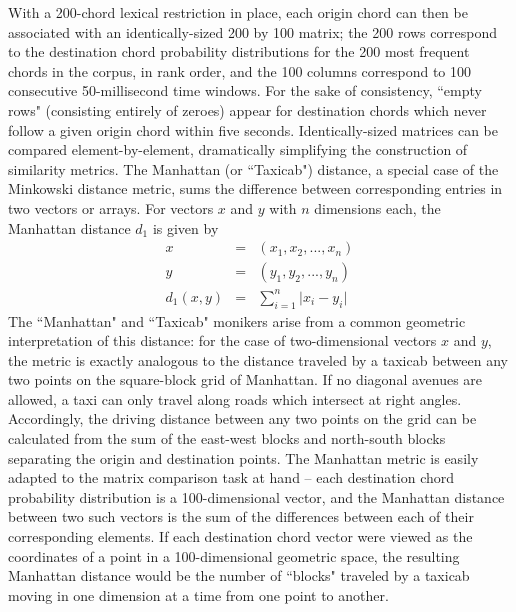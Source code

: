 With a 200-chord lexical restriction in place, each origin chord can then be associated with an identically-sized 200 by 100 matrix; the 200 rows correspond to the destination chord probability distributions for the 200 most frequent chords in the corpus, in rank order, and the 100 columns correspond to 100 consecutive 50-millisecond time windows.  For the sake of consistency, ``empty rows" (consisting entirely of zeroes) appear for destination chords which never follow a given origin chord within five seconds.  Identically-sized matrices can be compared element-by-element, dramatically simplifying the construction of similarity metrics.  The Manhattan (or ``Taxicab") distance, a special case of the Minkowski distance metric, sums the difference between corresponding entries in two vectors or arrays.  For vectors $x$ and $y$ with $n$ dimensions each, the Manhattan distance $d_1$ is given by
\begin{eqnarray*}
x &=& (x_1,x_2,...,x_n) \\
y &=& (y_1,y_2,...,y_n) \\
d_1(x,y) &=& \sum_{i=1}^n \lvert x_i - y_i \rvert
\end{eqnarray*}
The ``Manhattan" and ``Taxicab" monikers arise from a common geometric interpretation of this distance: for the case of two-dimensional vectors $x$ and $y$, the metric is exactly analogous to the distance traveled by a taxicab between any two points on the square-block grid of Manhattan.  If no diagonal avenues are allowed, a taxi can only travel along roads which intersect at right angles.  Accordingly, the driving distance between any two points on the grid can be calculated from the sum of the east-west blocks and north-south blocks separating the origin and destination points.  The Manhattan metric is easily adapted to the matrix comparison task at hand -- each destination chord probability distribution is a 100-dimensional vector, and the Manhattan distance between two such vectors is the sum of the differences between each of their corresponding elements.  If each destination chord vector were viewed as the coordinates of a point in a 100-dimensional geometric space, the resulting Manhattan distance would be the number of ``blocks" traveled by a taxicab moving in one dimension at a time from one point to another.

